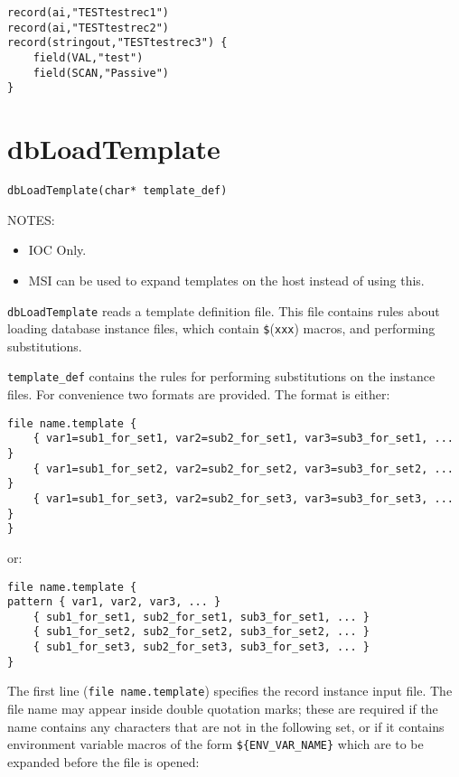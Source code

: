 \begin{verbatim}record(ai,"TESTtestrec1")
record(ai,"TESTtestrec2")
record(stringout,"TESTtestrec3") {
    field(VAL,"test")
    field(SCAN,"Passive")
}
\end{verbatim}

\section{dbLoadTemplate}

\begin{verbatim}dbLoadTemplate(char* template_def)
\end{verbatim}NOTES:

\begin{itemize}\item IOC Only.

\item MSI can be used to expand templates on the host instead of using this.

\end{itemize}\verb|dbLoadTemplate| reads a template definition file. This file contains rules about loading database instance files, which 
contain \verb|$|(\verb|xxx|) macros, and performing substitutions.

\verb|template_def| contains the rules for performing substitutions on the instance files. For convenience two formats are 
provided. The format is either:

\begin{verbatim}file name.template {
    { var1=sub1_for_set1, var2=sub2_for_set1, var3=sub3_for_set1, ... }
    { var1=sub1_for_set2, var2=sub2_for_set2, var3=sub3_for_set2, ... }
    { var1=sub1_for_set3, var2=sub2_for_set3, var3=sub3_for_set3, ... }
}
\end{verbatim}or:

\begin{verbatim}file name.template {
pattern { var1, var2, var3, ... }
    { sub1_for_set1, sub2_for_set1, sub3_for_set1, ... }
    { sub1_for_set2, sub2_for_set2, sub3_for_set2, ... }
    { sub1_for_set3, sub2_for_set3, sub3_for_set3, ... }
}
\end{verbatim}The first line (\verb|file name.template|) specifies the record instance input file. The file name may appear inside double 
quotation marks; these are required if the name contains any characters that are not in the following set, or if it contains 
environment variable macros of the form \verb|${ENV_VAR_NAME}| which are to be expanded before the file is opened:

